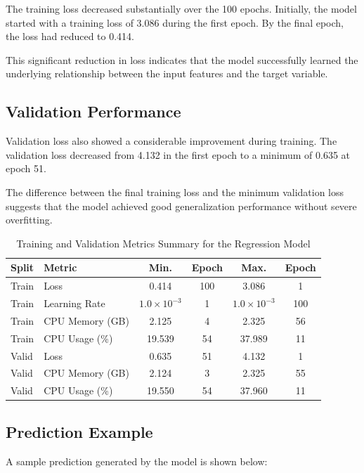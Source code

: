 \documentclass[12pt]{article}
\begin{document}
The training loss decreased substantially over the 100 epochs. Initially, the model started with a training loss of 3.086 during the first epoch. By the final epoch, the loss had reduced to 0.414.

This significant reduction in loss indicates that the model successfully learned the underlying relationship between the input features and the target variable.

\subsection{Validation Performance}

Validation loss also showed a considerable improvement during training. The validation loss decreased from 4.132 in the first epoch to a minimum of 0.635 at epoch 51.

The difference between the final training loss and the minimum validation loss suggests that the model achieved good generalization performance without severe overfitting.

\begin{table}[h]
\centering
\caption{Training and Validation Metrics Summary for the Regression Model}
\begin{tabular}{|l|l|c|c|c|c|}
\hline
\textbf{Split} & \textbf{Metric} & \textbf{Min.} & \textbf{Epoch} & \textbf{Max.} & \textbf{Epoch} \\
\hline
Train & Loss & 0.414 & 100 & 3.086 & 1 \\
Train & Learning Rate & $1.0 \times 10^{-3}$ & 1 & $1.0 \times 10^{-3}$ & 100 \\
Train & CPU Memory (GB) & 2.125 & 4 & 2.325 & 56 \\
Train & CPU Usage (\%) & 19.539 & 54 & 37.989 & 11 \\
\hline
Valid & Loss & 0.635 & 51 & 4.132 & 1 \\
Valid & CPU Memory (GB) & 2.124 & 3 & 2.325 & 55 \\
Valid & CPU Usage (\%) & 19.550 & 54 & 37.960 & 11 \\
\hline
\end{tabular}
\label{tab:regression_metrics_summary}
\end{table}

\subsection{Prediction Example}

A sample prediction generated by the model is shown below:
\end{document}
